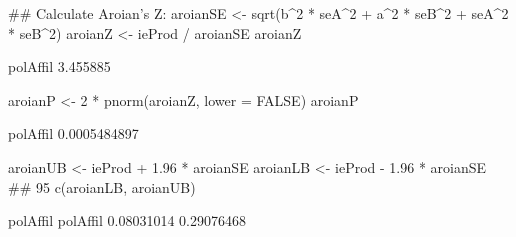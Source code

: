\begin{Schunk}
\begin{Sinput}
 ## Calculate Aroian's Z:
 aroianSE <- sqrt(b^2 * seA^2 + a^2 * seB^2 + seA^2 * seB^2)
 aroianZ <- ieProd / aroianSE
 aroianZ
\end{Sinput}
\begin{Soutput}
polAffil 
3.455885 
\end{Soutput}
\begin{Sinput}
 aroianP <- 2 * pnorm(aroianZ, lower = FALSE)
 aroianP
\end{Sinput}
\begin{Soutput}
    polAffil 
0.0005484897 
\end{Soutput}
\begin{Sinput}
 aroianUB <- ieProd + 1.96 * aroianSE
 aroianLB <- ieProd - 1.96 * aroianSE
 ## 95% Aroian CI:
 c(aroianLB, aroianUB)
\end{Sinput}
\begin{Soutput}
  polAffil   polAffil 
0.08031014 0.29076468 
\end{Soutput}
\end{Schunk}
